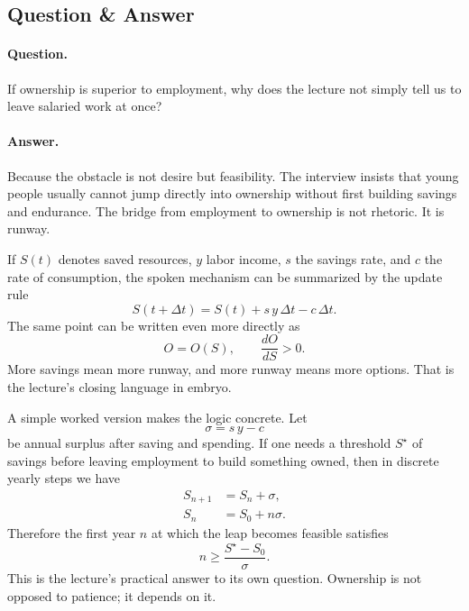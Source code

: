 \subsection{Question \& Answer}

\paragraph{Question.}
If ownership is superior to employment, why does the lecture not simply tell us to leave salaried work at once?

\paragraph{Answer.}
Because the obstacle is not desire but feasibility. The interview insists that young people usually cannot jump directly into ownership without first building savings and endurance. The bridge from employment to ownership is not rhetoric. It is runway.

If \(S(t)\) denotes saved resources, \(y\) labor income, \(s\) the savings rate, and \(c\) the rate of consumption, the spoken mechanism can be summarized by the update rule
\begin{equation}
S(t+\Delta t)=S(t)+s\,y\,\Delta t-c\,\Delta t.
\end{equation}
The same point can be written even more directly as
\begin{equation}
O=O(S), \qquad \frac{dO}{dS}>0.
\end{equation}
More savings mean more runway, and more runway means more options. That is the lecture's closing language in embryo.

A simple worked version makes the logic concrete. Let
\begin{equation}
\sigma = s\,y-c
\end{equation}
be annual surplus after saving and spending. If one needs a threshold \(S^\star\) of savings before leaving employment to build something owned, then in discrete yearly steps we have
\begin{align}
S_{n+1} &= S_n + \sigma, \\
S_n &= S_0 + n\sigma.
\end{align}
Therefore the first year \(n\) at which the leap becomes feasible satisfies
\begin{equation}
n \ge \frac{S^\star-S_0}{\sigma}.
\end{equation}
This is the lecture's practical answer to its own question. Ownership is not opposed to patience; it depends on it.

